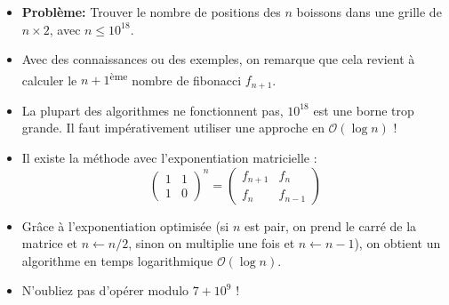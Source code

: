 \begin{frame}
    \frametitle{\problemtitle}
    \begin{itemize}
        \item<+-> \textbf{Problème:} Trouver le nombre de positions des $n$ boissons dans une grille de $n\times 2$, avec $n \le 10^{18}$.
        \item<+-> Avec des connaissances ou des exemples, on remarque que cela revient à calculer le $n+1$\textsuperscript{ème} nombre de fibonacci $f_{n+1}$.
        \item<+-> La plupart des algorithmes ne fonctionnent pas, $10^{18}$ est une borne trop grande. Il faut impérativement utiliser une approche en $\mathcal{O}(\log n)$ !
        \item<+-> Il existe la méthode avec l'exponentiation matricielle :
        \[
        \begin{pmatrix}
        1 & 1\\
        1 & 0
        \end{pmatrix}^n =
        \begin{pmatrix}
        f_{n+1} & f_{n}\\
        f_{n} & f_{n-1}
        \end{pmatrix}
        \]
        \item<+-> Grâce à l'exponentiation optimisée (si $n$ est pair, on prend le carré de la matrice et $n\leftarrow n/2$, sinon on multiplie une fois et $n\leftarrow n-1$), on obtient un algorithme en temps logarithmique $\mathcal{O}(\log n)$.
        \item<+-> N'oubliez pas d'opérer modulo $7+10^9$ !
    \end{itemize}
\end{frame}
